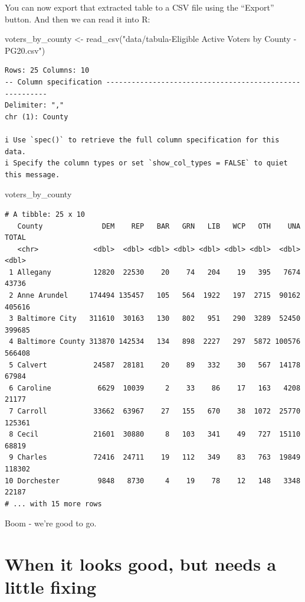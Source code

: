 \documentclass[
  letterpaper,
  DIV=11,
  numbers=noendperiod]{scrreprt}
\newenvironment{Shaded}{\begin{snugshade}}{\end{snugshade}}
\newcommand{\FunctionTok}[1]{\textcolor[rgb]{0.28,0.35,0.67}{#1}}
\newcommand{\NormalTok}[1]{\textcolor[rgb]{0.00,0.23,0.31}{#1}}
\newcommand{\OtherTok}[1]{\textcolor[rgb]{0.00,0.23,0.31}{#1}}
\newcommand{\StringTok}[1]{\textcolor[rgb]{0.13,0.47,0.30}{#1}}
\begin{document}
You can now export that extracted table to a CSV file using the
``Export'' button. And then we can read it into R:

\begin{Shaded}
\begin{Highlighting}[]
\NormalTok{voters\_by\_county }\OtherTok{\textless{}{-}} \FunctionTok{read\_csv}\NormalTok{(}\StringTok{"data/tabula{-}Eligible Active Voters by County {-} PG20.csv"}\NormalTok{)}
\end{Highlighting}
\end{Shaded}

\begin{verbatim}
Rows: 25 Columns: 10
-- Column specification --------------------------------------------------------
Delimiter: ","
chr (1): County

i Use `spec()` to retrieve the full column specification for this data.
i Specify the column types or set `show_col_types = FALSE` to quiet this message.
\end{verbatim}

\begin{Shaded}
\begin{Highlighting}[]
\NormalTok{voters\_by\_county}
\end{Highlighting}
\end{Shaded}

\begin{verbatim}
# A tibble: 25 x 10
   County              DEM    REP   BAR   GRN   LIB   WCP   OTH    UNA  TOTAL
   <chr>             <dbl>  <dbl> <dbl> <dbl> <dbl> <dbl> <dbl>  <dbl>  <dbl>
 1 Allegany          12820  22530    20    74   204    19   395   7674  43736
 2 Anne Arundel     174494 135457   105   564  1922   197  2715  90162 405616
 3 Baltimore City   311610  30163   130   802   951   290  3289  52450 399685
 4 Baltimore County 313870 142534   134   898  2227   297  5872 100576 566408
 5 Calvert           24587  28181    20    89   332    30   567  14178  67984
 6 Caroline           6629  10039     2    33    86    17   163   4208  21177
 7 Carroll           33662  63967    27   155   670    38  1072  25770 125361
 8 Cecil             21601  30880     8   103   341    49   727  15110  68819
 9 Charles           72416  24711    19   112   349    83   763  19849 118302
10 Dorchester         9848   8730     4    19    78    12   148   3348  22187
# ... with 15 more rows
\end{verbatim}

Boom - we're good to go.

\hypertarget{when-it-looks-good-but-needs-a-little-fixing}{%
\section{When it looks good, but needs a little
fixing}\label{when-it-looks-good-but-needs-a-little-fixing}}
\end{document}
